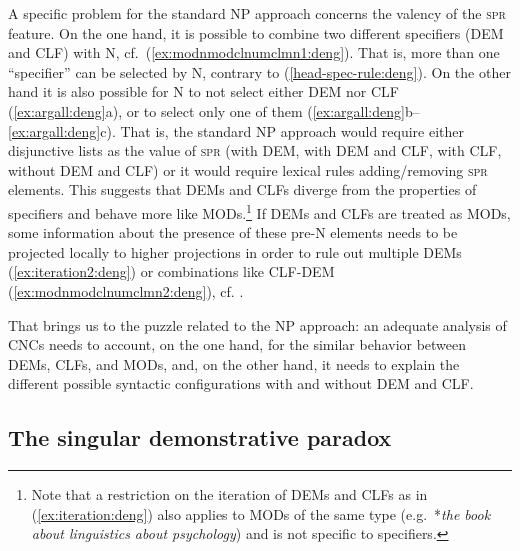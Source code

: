 \documentclass[output=paper,colorlinks,citecolor=brown]{langscibook}
\begin{document}
A specific problem for the standard NP approach concerns the valency of the \textsc{spr} feature. On the one hand, it is possible to combine two different specifiers (DEM and CLF) with N, cf.\ (\ref{ex:modnmodclnumclmn1:deng}). That is, more than one ``specifier'' can be selected by N, contrary to (\ref{head-spec-rule:deng}). On the other hand it is also possible for N to not select either DEM nor CLF (\ref{ex:argall:deng}a), or to select only one of them (\ref{ex:argall:deng}b--\ref{ex:argall:deng}c). That is, the standard NP approach would require either disjunctive lists as the value of \textsc{spr} (with DEM, with DEM and CLF, with CLF, without DEM and CLF) or it would require lexical rules adding/removing \textsc{spr} elements. This suggests that DEMs and CLFs diverge from the properties of specifiers and behave more like MODs.\footnote{Note that a restriction on the iteration of DEMs and CLFs as in (\ref{ex:iteration:deng}) also applies to MODs of the same type (e.g.\ *\textit{the book about linguistics about psychology}) and is not specific to specifiers.}  If DEMs and CLFs are treated as MODs, some information about the presence of these pre-N elements needs to be projected locally to higher projections in order to rule out multiple DEMs (\ref{ex:iteration2:deng}) or combinations like CLF-DEM (\ref{ex:modnmodclnumclmn2:deng}), cf. . 


That brings us to the puzzle related to the NP approach: 
an adequate analysis of CNCs needs to account, on the one hand, for the similar behavior between DEMs, CLFs, and MODs, and, on the other hand, it needs to explain the different possible syntactic configurations with and without DEM and CLF. 






\subsection{The singular demonstrative paradox}\label{sec:sing:deng}
\end{document}
